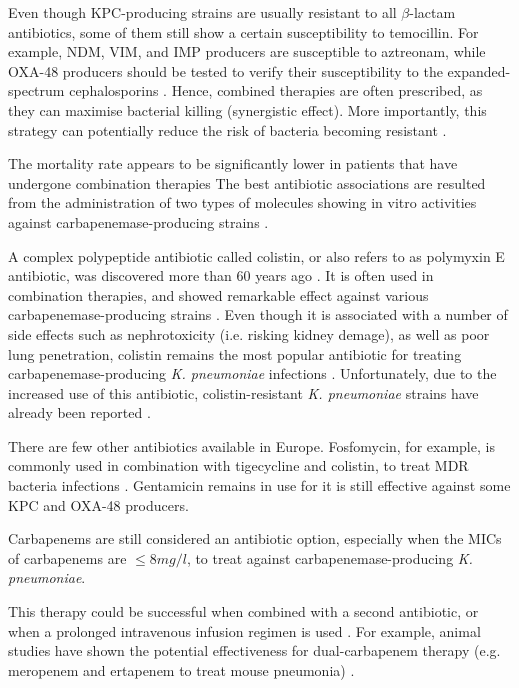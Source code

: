 \documentclass[11pt]{report}
\begin{document}
Even though KPC-producing strains are usually resistant to all $\beta$-lactam antibiotics, some of them still show a certain susceptibility to temocillin.
For example, NDM, VIM, and IMP producers are susceptible to aztreonam, while OXA-48 producers should be tested to verify their susceptibility to the expanded-spectrum cephalosporins \cite{girlich2009ctx}.
Hence, combined therapies are often prescribed, as they can maximise bacterial killing (synergistic effect).
More importantly, this strategy can potentially reduce the risk of bacteria becoming resistant \cite{pitout2015}.

The mortality rate appears to be significantly lower in patients that have undergone combination therapies \cite{tzouvelekis2014treating, zavascki2013combination}
The best antibiotic associations are resulted from the administration of two types of molecules showing in vitro activities against carbapenemase-producing strains \cite{falagas2013antibiotic, tzouvelekis2014treating}.

A complex polypeptide antibiotic called colistin, or also refers to as polymyxin E antibiotic, was discovered more than 60 years ago \cite{karaiskos2014multidrug, rodriguez2015diagnosis}.
It is often used in combination therapies, and showed remarkable effect against various carbapenemase-producing strains \cite{falagas2013antibiotic, temkin2014carbapenem}.
Even though it is associated with a number of side effects such as nephrotoxicity (i.e. risking kidney demage), as well as poor lung penetration, colistin remains the most popular antibiotic for treating carbapenemase-producing \emph{K. pneumoniae} infections \cite{karaiskos2014multidrug, rodriguez2015diagnosis}.
Unfortunately, due to the increased use of this antibiotic, 
colistin-resistant \emph{K. pneumoniae} strains have already been reported \cite{mammina2012ongoing}.

There are few other antibiotics available in Europe.
Fosfomycin, for example, is commonly used in combination with tigecycline and colistin, to treat MDR bacteria infections \cite{pontikis2014outcomes}.
Gentamicin remains in use for it is still effective against some KPC and OXA-48 producers.

Carbapenems are still considered an antibiotic option, especially when the MICs of carbapenems are $\le 8mg/l$, to treat against carbapenemase-producing \emph{K. pneumoniae}.

This therapy could be successful when combined with a second antibiotic, or when a prolonged intravenous infusion regimen is used \cite{tzouvelekis2014treating, daikos2014carbapenemase, tumbarello2012predictors}.
For example, animal studies have shown the potential effectiveness for dual-carbapenem therapy (e.g. meropenem and ertapenem to treat mouse pneumonia) 
\cite{wiskirchen2014vivo}.
\end{document}
